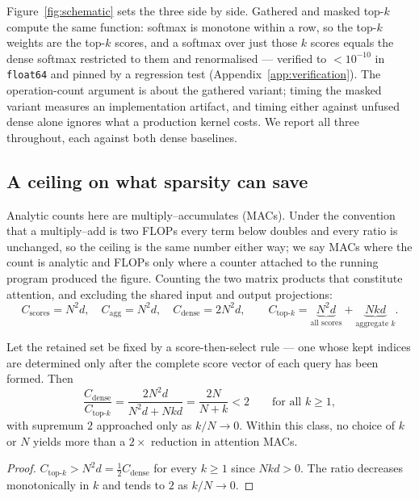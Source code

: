 Figure~\ref{fig:schematic} sets the three side by side. Gathered and masked
top-$k$ compute the same function: softmax is monotone within a row, so the
top-$k$ weights are the top-$k$ scores, and a softmax over just those $k$
scores equals the dense softmax restricted to them and renormalised --- verified
to $<10^{-10}$ in \texttt{float64} and pinned by a regression test
(Appendix~\ref{app:verification}). The operation-count argument is about the
gathered variant; timing the masked variant measures an implementation
artifact, and timing either against unfused dense alone ignores what a
production kernel costs. We report all three throughout, each against both
dense baselines.

\subsection{A ceiling on what sparsity can save}
\label{sec:bound}

Analytic counts here are multiply--accumulates (MACs). Under the convention
that a multiply--add is two FLOPs every term below doubles and every ratio is
unchanged, so the ceiling is the same number either way; we say MACs where the
count is analytic and FLOPs only where a counter attached to the running
program produced the figure. Counting the two matrix products that constitute
attention, and excluding the shared input and output projections:
\begin{equation}
C_{\text{scores}} = N^2 d, \quad C_{\text{agg}} = N^2 d, \quad
C_{\text{dense}} = 2N^2 d, \qquad
C_{\text{top-}k} = \underbrace{N^2 d}_{\text{all scores}} + \underbrace{Nkd}_{\text{aggregate }k}.
\end{equation}

\begin{proposition}
\label{prop:ceiling}
Let the retained set be fixed by a score-then-select rule --- one whose kept
indices are determined only after the complete score vector of each query has
been formed. Then
\begin{equation}
\frac{C_{\text{dense}}}{C_{\text{top-}k}}
= \frac{2N^2 d}{N^2 d + Nkd} = \frac{2N}{N+k} < 2
\qquad \text{for all } k \ge 1,
\end{equation}
with supremum $2$ approached only as $k/N \to 0$. Within this class, no choice
of $k$ or $N$ yields more than a $2\times$ reduction in attention MACs.
\end{proposition}

\begin{proof}
$C_{\text{top-}k} > N^2 d = \tfrac12 C_{\text{dense}}$ for every $k \ge 1$
since $Nkd > 0$. The ratio decreases monotonically in $k$ and tends to $2$ as
$k/N \to 0$.
\end{proof}

